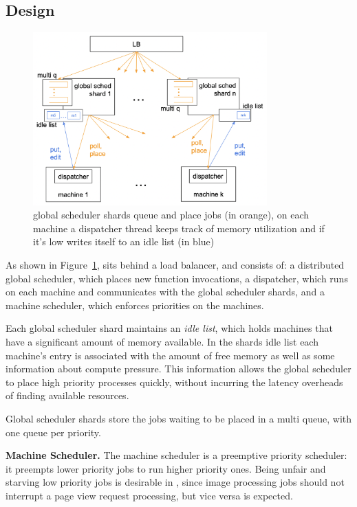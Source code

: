 \subsection{\Sys{} Design}

\begin{figure}[t]
    \centering
      \includegraphics[width=9cm]{img/overview.png}
      \caption{ global scheduler shards queue and place jobs (in orange), 
      on each machine a dispatcher thread keeps track of memory utilization 
      and if it's low writes itself to an idle list (in blue) }
    \label{fig:overview}
\end{figure}
  

As shown in Figure~\ref{fig:overview}, \sys{} sits behind a load balancer, and
consists of: a distributed global scheduler, which places new function
invocations, a dispatcher, which runs on each machine and communicates with the
global scheduler shards, and a machine scheduler, which enforces priorities on
the machines.

Each global scheduler shard maintains an \textit{idle list}, which holds
machines that have a significant amount of memory available. In the shards idle
list each machine's entry is associated with the amount of free memory as well
as some information about compute pressure. This information allows the global
scheduler to place high priority processes quickly, without incurring the
latency overheads of finding available resources.

Global scheduler shards store the jobs waiting to be placed in a multi queue,
with one queue per priority.


\textbf{Machine Scheduler.}
The machine scheduler is a preemptive priority scheduler: it preempts lower
priority jobs to run higher priority ones. Being unfair and starving low
priority jobs is desirable in \sys{}, since image processing jobs should not
interrupt a page view request processing, but vice versa is expected.


